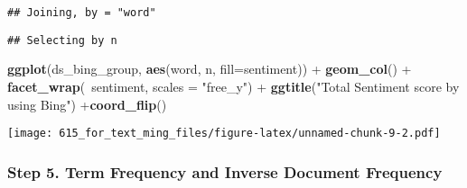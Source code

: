 \documentclass[]{article}
\newenvironment{Shaded}{\begin{snugshade}}{\end{snugshade}}
\newcommand{\KeywordTok}[1]{\textcolor[rgb]{0.13,0.29,0.53}{\textbf{{#1}}}}
\newcommand{\DataTypeTok}[1]{\textcolor[rgb]{0.13,0.29,0.53}{{#1}}}
\newcommand{\DecValTok}[1]{\textcolor[rgb]{0.00,0.00,0.81}{{#1}}}
\newcommand{\StringTok}[1]{\textcolor[rgb]{0.31,0.60,0.02}{{#1}}}
\newcommand{\CommentTok}[1]{\textcolor[rgb]{0.56,0.35,0.01}{\textit{{#1}}}}
\newcommand{\OtherTok}[1]{\textcolor[rgb]{0.56,0.35,0.01}{{#1}}}
\newcommand{\NormalTok}[1]{{#1}}
\begin{document}
\begin{Shaded}
\end{Shaded}

\begin{verbatim}
## Joining, by = "word"
\end{verbatim}

\begin{Shaded}
\end{Shaded}

\begin{verbatim}
## Selecting by n
\end{verbatim}

\begin{Shaded}
\begin{Highlighting}[]
\KeywordTok{ggplot}\NormalTok{(ds_bing_group, }\KeywordTok{aes}\NormalTok{(word, n, }\DataTypeTok{fill=}\NormalTok{sentiment)) +}\StringTok{ }\KeywordTok{geom_col}\NormalTok{() +}\StringTok{ }\KeywordTok{facet_wrap}\NormalTok{(~sentiment, }\DataTypeTok{scales =} \StringTok{"free_y"}\NormalTok{) +}\StringTok{ }
\StringTok{  }\KeywordTok{ggtitle}\NormalTok{(}\StringTok{"Total Sentiment score by using Bing"}\NormalTok{)  +}\KeywordTok{coord_flip}\NormalTok{()}
\end{Highlighting}
\end{Shaded}

\texttt{[image: 615\_for\_text\_ming\_files/figure-latex/unnamed-chunk-9-2.pdf]}

\subsubsection{Step 5. Term Frequency and Inverse Document
Frequency}\label{step-5.-term-frequency-and-inverse-document-frequency}
\end{document}
